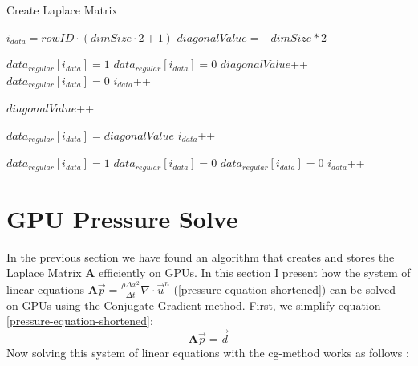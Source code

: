 \begin{algorithm}
\caption{Create Laplace Matrix }\label{laplace-matrix-generation}
\begin{algorithmic}[1]
	\State $i_{data} = rowID \cdot (dimSize \cdot 2 + 1)$
	\State $diagonalValue = - dimSize * 2$
	
	\State
	\State {}
			\State $data_{regular}[i_{data}] = 1$
			\State $data_{regular}[i_{data}] = 0$
			\State $diagonalValue$++
			\State $data_{regular}[i_{data}] = 0$
		\EndIf
		\State $i_{data}$++
	\EndFor
	
	\State
	\State {}
			\State $diagonalValue$++
		\EndIf
	\EndFor
	
	\State
	\State {}
	\State $data_{regular}[i_{data}] = diagonalValue$
	\State $i_{data}$++
	
	\State
	\State {}
			\State $data_{regular}[i_{data}] = 1$
			\State $data_{regular}[i_{data}] = 0$
			\State $data_{regular}[i_{data}] = 0$
		\EndIf
		\State $i_{data}$++
	\EndFor
\EndProcedure
\end{algorithmic}
\end{algorithm}



\newpage
\section{GPU Pressure Solve}
In the previous section we have found an algorithm that creates and stores the Laplace Matrix \textbf{A} efficiently on GPUs. In this section I present how the system of linear equations $\mathbf{A}\vec{p} = \frac{\rho \Delta x^2}{\Delta t}\nabla \cdot \vec{u}^n$ (\ref{pressure-equation-shortened}) can be solved on GPUs using the Conjugate Gradient method. First, we simplify equation \ref{pressure-equation-shortened}:
\begin{equation}
	\mathbf{A}\vec{p} = \vec{d} 
\end{equation}
Now solving this system of linear equations with the cg-method works as follows \parencite{hestenes1952methods}:


